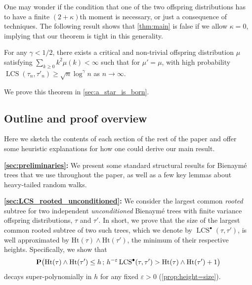 \documentclass[11pt,reqno]{amsart}
\newcommand{\Ht}{\mathrm{Ht}}
\newcommand{\LCS}{\operatorname{LCS}}
\begin{document}
One may wonder if the condition that one of the two offspring distributions has to have a finite $(2+\kappa)$th moment is necessary, or just a consequence of techniques. The following result shows that \cref{thm:main} is false if we allow $\kappa=0$, implying that our theorem is tight in this generality. 

\begin{thm}\label{thm:a_star_is_born}
    For any $\gamma < 1/2$, there exists a critical and non-trivial offspring distribution $\mu$ satisfying $\sum_{k\ge 0}k^2\mu(k)<\infty$ such that for $\mu'=\mu$, with high probability $\LCS(\tau_n,\tau'_n) \geq \sqrt{n} \log^\gamma n$ as $n\to\infty$.
\end{thm}

We prove this theorem in \cref{sec:a_star_is_born}.


\subsection{Outline and proof overview}
Here we sketch the contents of each section of the rest of the paper and offer some heuristic explanations for how one could derive our main result.  
\medskip

{\bf \cref{sec:preliminaries}:} We present some standard structural results for Bienaym\'{e} trees that we use throughout the paper, as well as a few key lemmas about heavy-tailed random walks.
\medskip

{\bf \cref{sec:LCS_rooted_unconditioned}:}  We consider the largest common \emph{rooted} subtree for two independent \emph{unconditioned} Bienaym\'{e} trees with finite variance offspring distributions, $\tau$ and $\tau'$. In short, we prove that the size of the largest common rooted subtree of two such trees, which we denote by $\LCS^\bullet(\tau,\tau')$, is well approximated by $\Ht(\tau) \wedge \Ht(\tau')$, the minimum of their respective heights. Specifically, we show that
\begin{equation}\label{eq:expression_for_bootstrap}
\prob\big( \Ht(\tau) \wedge \Ht(\tau') \leq h \,;\,  h^{-\varepsilon} \LCS^\bullet(\tau,\tau') > \Ht(\tau) \wedge \Ht(\tau')+1 \big)
\end{equation}
decays super-polynomially in $h$ for any fixed $\varepsilon > 0$ (\cref{prop:height=size}).
\smallskip
\end{document}
